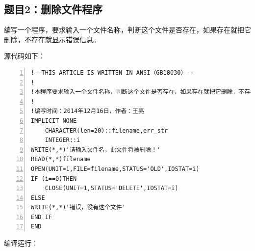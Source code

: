 \documentclass[hyperref,UTF-8]{ctexart}
\begin{document}
\subsection{题目2：删除文件程序}
编写一个程序，要求输入一个文件名称，判断这个文件是否存在，如果存在就把它删除，不存在就显示错误信息。

源代码如下：

\begin{Verbatim}[numbers=left,commandchars=\\\{\},fontsize=\small]
!--THIS ARTICLE IS WRITTEN IN ANSI（GB18030）--
!
!本程序要求输入一个文件名称，判断这个文件是否存在，如果存在就把它删除，不存在就显示错误信息。
!
!编写时间：2014年12月16日，作者：王亮
IMPLICIT NONE
	CHARACTER(len=20)::filename,err_str
	INTEGER::i
WRITE(*,*)'请输入文件名，此文件将被删除！'
READ(*,*)filename
OPEN(UNIT=1,FILE=filename,STATUS='OLD',IOSTAT=i)
IF (i==0)THEN
	CLOSE(UNIT=1,STATUS='DELETE',IOSTAT=i)
ELSE
WRITE(*,*)'错误，没有这个文件'
END IF
END
\end{Verbatim}

编译运行：
\end{document}
